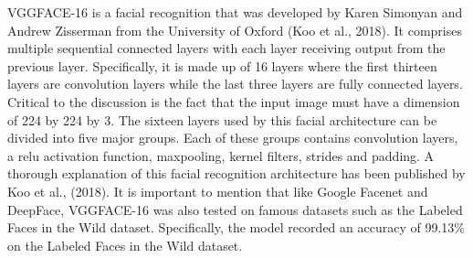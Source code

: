 \documentclass[
  12pt,
]{article}
\begin{document}
VGGFACE-16 is a facial recognition that was developed by Karen Simonyan
and Andrew Zisserman from the University of Oxford (Koo et al., 2018).
It comprises multiple sequential connected layers with each layer
receiving output from the previous layer. Specifically, it is made up of
16 layers where the first thirteen layers are convolution layers while
the last three layers are fully connected layers. Critical to the
discussion is the fact that the input image must have a dimension of 224
by 224 by 3. The sixteen layers used by this facial architecture can be
divided into five major groups. Each of these groups contains
convolution layers, a relu activation function, maxpooling, kernel
filters, strides and padding. A thorough explanation of this facial
recognition architecture has been published by Koo et al., (2018). It is
important to mention that like Google Facenet and DeepFace, VGGFACE-16
was also tested on famous datasets such as the Labeled Faces in the Wild
dataset. Specifically, the model recorded an accuracy of 99.13\% on the
Labeled Faces in the Wild dataset.
\end{document}
